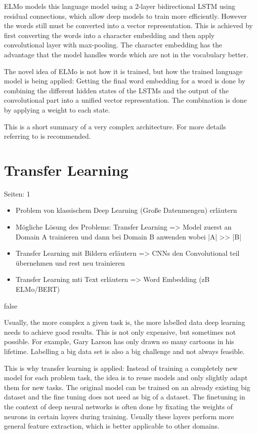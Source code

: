 \documentclass[draft,final,oneside]{vutinfth} %
\begin{document}
ELMo models this language model using a 2-layer bidirectional LSTM using residual connections, which allow deep models to train more efficiently. However the words still must be converted into a vector representation. This is achieved by first converting the words into a character embedding and then apply convolutional layer with max-pooling. The character embedding has the advantage that the model handles words which are not in the vocabulary better.

The novel idea of ELMo is not how it is trained, but how the trained language model is being applied: Getting the final word embedding for a word is done by combining the different hidden states of the LSTMs and the output of the convolutional part into a unified vector representation. The combination is done by applying a weight to each state.

This is a short summary of a very complex architecture. For more details referring to \cite{elmo} is recommended.


\fi

\section{Transfer Learning}
Seiten: 1
\begin{itemize}
\item Problem von klassischem Deep Learning (Große Datenmengen) erläutern
\item Mögliche Lösung des Problems: Transfer Learning => Model zuerst an Domain A trainieren und dann bei Domain B anwenden wobei |A| >> |B|
\item Transfer Learning mit Bildern erläutern => CNNs den Convolutional teil übernehmen und rest neu trainieren
\item Transfer Learning mti Text erläutern => Word Embedding (zB ELMo/BERT)
\end{itemize}

\if false

Usually, the more complex a given task is, the more labelled data deep learning needs to achieve good results. This is not only expensive, but sometimes not possible. For example, Gary Larson has only drawn so many cartoons in his lifetime. Labelling a big data set is also a big challenge and not always feasible.

This is why transfer learning is applied: Instead of training a completely new model for each problem task, the idea is to reuse models and only slightly adapt them for new tasks. The original model can be trained on an already existing big dataset and the fine tuning does not need as big of a dataset. The finetuning in the context of deep neural networks is often done by fixating the weights of neurons in certain layers during training. Usually these layers perform more general feature extraction, which is better applicable to other domains.
\end{document}
